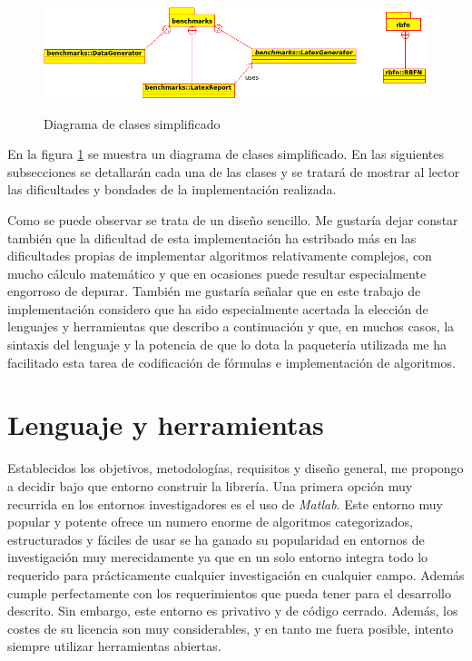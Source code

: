 \documentclass[10pt,a4paper]{report}
\begin{document}
\begin{figure}[!h]{}
    \centering
    \includegraphics[scale=0.8]{img/classdiagram.png}
    \label{fig:classDiagram}
    \caption{Diagrama de clases simplificado}
\end{figure}

En la figura \ref{fig:classDiagram} se muestra un diagrama de clases simplificado. En las siguientes subsecciones se detallarán cada una de las clases y se tratará de mostrar al lector las dificultades y bondades de la implementación realizada.

Como se puede observar se trata de un diseño sencillo. Me gustaría dejar constar también que la dificultad de esta implementación ha estribado más en las dificultades propias de implementar algoritmos relativamente complejos, con mucho cálculo matemático y que en ocasiones puede resultar especialmente engorroso de depurar. También me gustaría señalar que en este trabajo de implementación considero que ha sido especialmente acertada la elección de lenguajes y herramientas que describo a continuación y que, en muchos casos, la sintaxis del lenguaje y la potencia de que lo dota la paquetería utilizada me ha facilitado esta tarea de codificación de fórmulas e implementación de algoritmos.

\section{Lenguaje y herramientas}
Establecidos los objetivos, metodologías, requisitos y diseño general, me propongo a decidir bajo que entorno construir la librería.
Una primera opción muy recurrida en los entornos investigadores es el uso de \textit{Matlab}. Este entorno muy popular y potente ofrece un numero enorme de algoritmos categorizados, estructurados y fáciles de usar se ha ganado su popularidad en entornos de investigación muy merecidamente ya que en un solo entorno integra todo lo requerido para prácticamente cualquier investigación en cualquier campo. Además cumple perfectamente con los requerimientos que pueda tener para el desarrollo descrito. Sin embargo, este entorno es privativo y de código cerrado. Además, los costes de su licencia son muy considerables, y en tanto me fuera posible, intento siempre utilizar herramientas abiertas.
\end{document}
